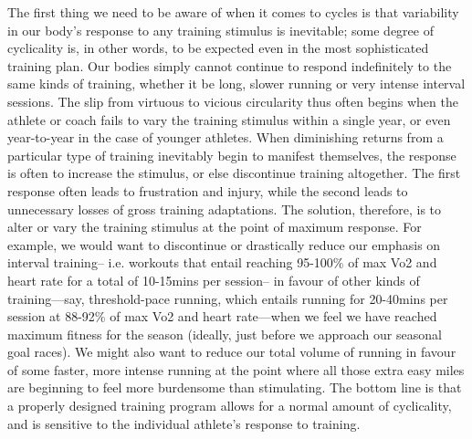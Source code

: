 The first thing we need to be aware of when it comes to cycles is that variability in our body’s response to any training stimulus is inevitable; some degree of cyclicality is, in other words, to be expected even in the most sophisticated training plan. Our bodies simply cannot continue to respond indefinitely to the same kinds of training, whether it be long, slower running or very intense interval sessions. The slip from virtuous to vicious circularity thus often begins when the athlete or coach fails to vary the training stimulus within a single year, or even year-to-year in the case of younger athletes. When diminishing returns from a particular type of training inevitably begin to manifest themselves, the response is often to increase the stimulus, or else discontinue training altogether. The first response often leads to frustration and injury, while the second leads to unnecessary losses of gross training adaptations. The solution, therefore, is to alter or vary the training stimulus at the point of maximum response. For example, we would want to discontinue or drastically reduce our emphasis on interval training-- i.e. workouts that entail reaching 95-100\% of max Vo2 and heart rate for a total of 10-15mins per session-- in favour of other kinds of training—say, threshold-pace running, which entails running for 20-40mins per session at 88-92\% of max Vo2 and heart rate—when we feel we have reached maximum fitness for the season (ideally, just before we approach our seasonal goal races). We might also want to reduce our total volume of running in favour of some faster, more intense running at the point where all those extra easy miles are beginning to feel more burdensome than stimulating. The bottom line is that a properly designed training program allows for a normal amount of cyclicality, and is sensitive to the individual athlete’s response to training.

